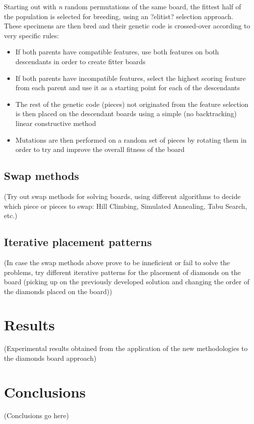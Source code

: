 \documentclass{llncs}
\begin{document}
Starting out with \textit{n} random permutations of the same board, the fittest half of the population is selected for breeding, using an ?elitist? selection approach. These specimens are then bred and their genetic code is crossed-over according to very specific rules:

\begin{itemize}
	\item If both parents have compatible features, use both features on both descendants in order to create fitter boards
	\item If both parents have incompatible features, select the highest scoring feature from each parent and use it as a starting point for each of the descendants
	\item The rest of the genetic code (pieces) not originated from the feature selection is then placed on the descendant boards using a simple (no backtracking) linear constructive method
	\item Mutations are then performed on a random set of pieces by rotating them in order to try and improve the overall fitness of the board
\end{itemize}

\subsection{Swap methods}

(Try out swap methods for solving boards, using different algorithms to decide which piece or pieces to swap: Hill Climbing, Simulated Annealing, Tabu Search, etc.)

\subsection{Iterative placement patterns}

(In case the swap methods above prove to be inneficient or fail to solve the problems, try different iterative patterns for the placement of diamonds on the board (picking up on the previously developed solution and changing the order of the diamonds placed on the board))

\section{Results}

(Experimental results obtained from the application of the new methodologies to the diamonds board approach)

\section{Conclusions}

(Conclusions go here)
%
%

\end{document}
